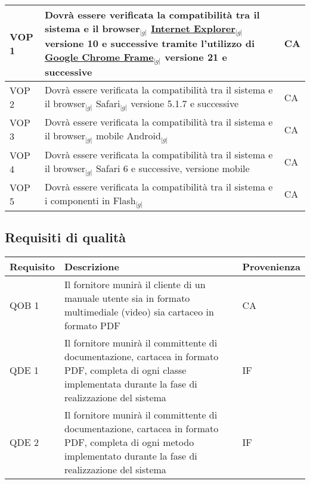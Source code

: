 \begin{longtable}{p{} p{} p{} }
\midrule
VOP 1 & Dovrà essere verificata la compatibilità tra il sistema e il browser$_{|g|}$ \underline{Internet Explorer}$_{|g|}$ versione 10 e successive tramite l'utilizzo di \underline{Google Chrome Frame}$_{|g|}$ versione 21 e successive & CA\\
\midrule
VOP 2 &  Dovrà essere verificata la compatibilità tra il sistema e il browser$_{|g|}$ Safari$_{|g|}$ versione 5.1.7 e successive & CA\\
\midrule
VOP 3 & Dovrà essere verificata la compatibilità tra il sistema e il browser$_{|g|}$ mobile Android$_{|g|}$ & CA\\
\midrule
VOP 4 & Dovrà essere verificata la compatibilità tra il sistema e il browser$_{|g|}$ Safari 6 e successive, versione mobile & CA\\
\midrule
VOP 5 & Dovrà essere verificata la compatibilità tra il sistema e i componenti in Flash$_{|g|}$ & CA\\
\end{longtable}
\newpage

\subsection{Requisiti di qualità}
\begin{longtable}{p{} p{} p{} }
\rowcolors{2}{light}{}
\textbf{Requisito} & \textbf{Descrizione} & \textbf{Provenienza} \\
\midrule
QOB 1 & Il fornitore munirà il cliente di un manuale utente sia in formato multimediale (video) sia cartaceo in formato PDF & CA\\
\midrule
QDE 1 & Il fornitore munirà il committente di documentazione, cartacea in formato PDF, completa di ogni classe implementata durante la fase di realizzazione del sistema & IF\\
\midrule
QDE 2 & Il fornitore munirà il committente di documentazione, cartacea in formato PDF, completa di ogni metodo implementato durante la fase di realizzazione del sistema & IF\\

\end{longtable}